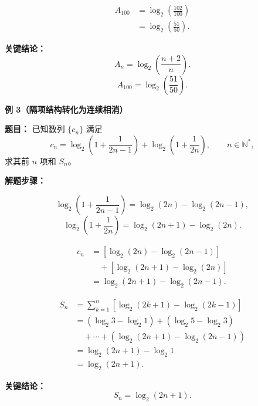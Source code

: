 \begin{examplebox}
\begin{description}[style=nextline, leftmargin=2.8em, labelsep=0.5em, itemsep=0.45em]
		\item[\textbf{第三步（代入 \(n=100\)）：}]
		      \[
			      \begin{aligned}
			      A_{100}
			      &=\log_2\!\left(\frac{102}{100}\right)\\
			      &=\log_2\!\left(\frac{51}{50}\right).
			      \end{aligned}
		      \]
	\end{description}

	\textbf{\textcolor{CExample}{关键结论：}}
	\[
		\boxed{
		A_n=\log_2\!\left(\frac{n+2}{n}\right)
		}.
	\]
	\[
		\boxed{
		A_{100}=\log_2\!\left(\frac{51}{50}\right)
		}.
	\]

	\medskip
	\textbf{\textcolor{CExample}{例 3（隔项结构转化为连续相消）}}

	\textbf{\textcolor{CExample}{题目：}}
	已知数列 \(\{c_n\}\) 满足
	\[
		c_n=
		\log_2\!\left(1+\frac{1}{2n-1}\right)
		+\log_2\!\left(1+\frac{1}{2n}\right),
		\qquad n\in\mathbb N^*,
	\]
	求其前 \(n\) 项和 \(S_n\)。

	\textbf{\textcolor{CExample}{解题步骤：}}
	\begin{description}[style=nextline, leftmargin=2.8em, labelsep=0.5em, itemsep=0.45em]
		\item[\textbf{第一步（分别裂项）：}]
		      \[
			      \log_2\!\left(1+\frac{1}{2n-1}\right)
			      =\log_2(2n)-\log_2(2n-1),
		      \]
		      \[
			      \log_2\!\left(1+\frac{1}{2n}\right)
			      =\log_2(2n+1)-\log_2(2n).
		      \]

		\item[\textbf{第二步（先化简通项）：}]
		      \[
			      \begin{aligned}
			      c_n
			      &=[\log_2(2n)-\log_2(2n-1)]\\
			      &\quad +[\log_2(2n+1)-\log_2(2n)]\\
			      &=\log_2(2n+1)-\log_2(2n-1).
			      \end{aligned}
		      \]

		\item[\textbf{第三步（对通项再次裂项相消）：}]
		      \[
			      \begin{aligned}
			      S_n
			      &=\sum_{k=1}^{n}
			      [\log_2(2k+1)-\log_2(2k-1)]\\
			      &=(\log_2 3-\log_2 1)
			      +(\log_2 5-\log_2 3)\\
			      &\quad +\cdots
			      +(\log_2(2n+1)-\log_2(2n-1))\\
			      &=\log_2(2n+1)-\log_2 1\\
			      &=\log_2(2n+1).
			      \end{aligned}
		      \]
	\end{description}

	\textbf{\textcolor{CExample}{关键结论：}}
	\[
		\boxed{S_n=\log_2(2n+1)}.
	\]
\end{examplebox}